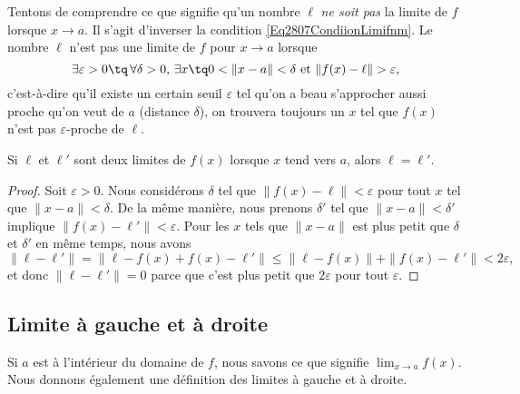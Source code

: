 Tentons de comprendre ce que signifie qu'un nombre $\ell$ \emph{ne soit pas} la limite de $f$ lorsque $x\to a$. Il s'agit d'inverser la condition \eqref{Eq2807CondiionLimifnm}. Le nombre $\ell$ n'est pas une limite de $f$ pour $x\to a$ lorsque
\begin{equation}		\label{EqCaractNonLim}
	\exists\varepsilon>0\tq\,\forall\delta>0,\,\exists x\tq 0<\| x-a \|<\delta\text{ et }\| f(x)-\ell \|>\varepsilon,
\end{equation}
c'est-à-dire qu'il existe un certain seuil $\varepsilon$ tel qu'on a beau s'approcher aussi proche qu'on veut de $a$ (distance $\delta$), on trouvera toujours un $x$ tel que $f(x)$ n'est pas $\varepsilon$-proche de $\ell$.

\begin{lemma}
	Si $\ell$ et $\ell'$ sont deux limites de $f(x)$ lorsque $x$ tend vers $a$, alors $\ell=\ell'$.
\end{lemma}

\begin{proof}
	Soit $\varepsilon>0$. Nous considérons $\delta$ tel que $\| f(x)-\ell \|<\varepsilon$ pour tout $x$ tel que $\| x-a \|<\delta$. De la même manière, nous prenons $\delta'$ tel que $\| x-a \|<\delta'$ implique $\| f(x)-\ell' \|<\varepsilon$. Pour les $x$ tels que $\| x-a \|$ est plus petit que $\delta$ et $\delta'$ en même temps, nous avons
	\begin{equation}
		\| \ell-\ell' \|=\| \ell-f(x)+f(x)-\ell' \|\leq\| \ell-f(x) \|+\| f(x)-\ell' \|<2\varepsilon,
	\end{equation}
	et donc $\| \ell-\ell' \|=0$ parce que c'est plus petit que $2\varepsilon$ pour tout $\varepsilon$.
\end{proof}

\subsection{Limite à gauche et à droite}

Si \( a\) est à l'intérieur du domaine de \( f\), nous savons ce que signifie \( \lim_{x\to a} f(x)\). Nous donnons également une définition des limites à gauche et à droite.

